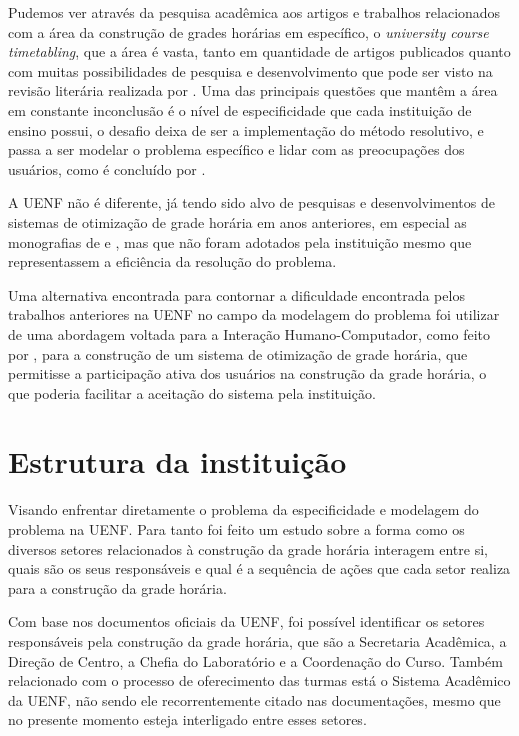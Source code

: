 Pudemos ver através da pesquisa acadêmica aos artigos e trabalhos relacionados com a área da construção de grades horárias em específico, o \textit{university course timetabling}, que a área é vasta, tanto em quantidade de artigos publicados quanto com muitas possibilidades de pesquisa e desenvolvimento que pode ser visto na revisão literária realizada por . Uma das principais questões que mantêm a área em constante inconclusão é o nível de especificidade que cada instituição de ensino possui, o desafio deixa de ser a implementação do método resolutivo, e passa a ser modelar o problema específico e lidar com as preocupações dos usuários, como é concluído por .

A UENF não é diferente, já tendo sido alvo de pesquisas e desenvolvimentos de sistemas de otimização de grade horária em anos anteriores, em especial as monografias de  e , mas que não foram adotados pela instituição mesmo que representassem a eficiência da resolução do problema.

Uma alternativa encontrada para contornar a dificuldade encontrada pelos trabalhos anteriores na UENF no campo da modelagem do problema foi utilizar de uma abordagem voltada para a Interação Humano-Computador, como feito por , para a construção de um sistema de otimização de grade horária, que permitisse a participação ativa dos usuários na construção da grade horária, o que poderia facilitar a aceitação do sistema pela instituição.

\section{Estrutura da instituição}

Visando enfrentar diretamente o problema da especificidade e modelagem do problema na UENF. Para tanto foi feito um estudo sobre a forma como os diversos setores relacionados à construção da grade horária interagem entre si, quais são os seus responsáveis e qual é a sequência de ações que cada setor realiza para a construção da grade horária.


Com base nos documentos oficiais da UENF, foi possível identificar os setores responsáveis pela construção da grade horária, que são a Secretaria Acadêmica, a Direção de Centro, a Chefia do Laboratório e a Coordenação do Curso. Também relacionado com o processo de oferecimento das turmas está o Sistema Acadêmico da UENF, não sendo ele recorrentemente citado nas documentações, mesmo que no presente momento esteja interligado entre esses setores.

